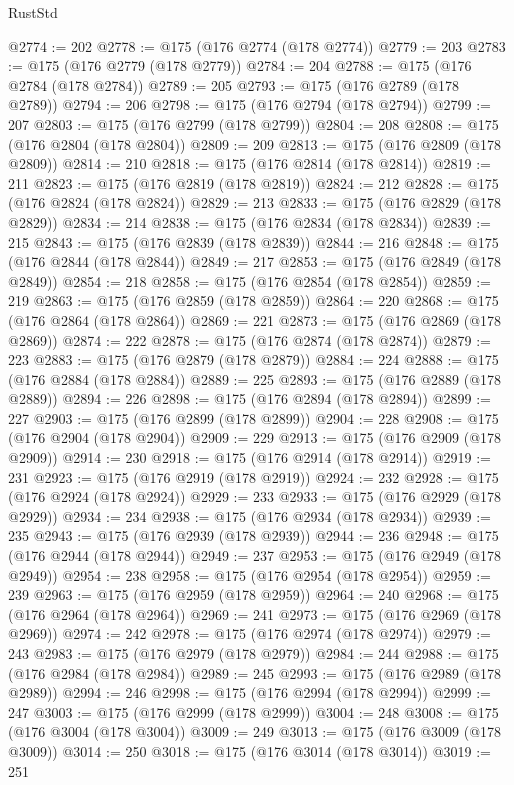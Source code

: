 \begin{lexlean}{RustStd}
\begin{coremodule}
@2774 := 202
@2778 := @175 (@176 @2774 (@178 @2774))
@2779 := 203
@2783 := @175 (@176 @2779 (@178 @2779))
@2784 := 204
@2788 := @175 (@176 @2784 (@178 @2784))
@2789 := 205
@2793 := @175 (@176 @2789 (@178 @2789))
@2794 := 206
@2798 := @175 (@176 @2794 (@178 @2794))
@2799 := 207
@2803 := @175 (@176 @2799 (@178 @2799))
@2804 := 208
@2808 := @175 (@176 @2804 (@178 @2804))
@2809 := 209
@2813 := @175 (@176 @2809 (@178 @2809))
@2814 := 210
@2818 := @175 (@176 @2814 (@178 @2814))
@2819 := 211
@2823 := @175 (@176 @2819 (@178 @2819))
@2824 := 212
@2828 := @175 (@176 @2824 (@178 @2824))
@2829 := 213
@2833 := @175 (@176 @2829 (@178 @2829))
@2834 := 214
@2838 := @175 (@176 @2834 (@178 @2834))
@2839 := 215
@2843 := @175 (@176 @2839 (@178 @2839))
@2844 := 216
@2848 := @175 (@176 @2844 (@178 @2844))
@2849 := 217
@2853 := @175 (@176 @2849 (@178 @2849))
@2854 := 218
@2858 := @175 (@176 @2854 (@178 @2854))
@2859 := 219
@2863 := @175 (@176 @2859 (@178 @2859))
@2864 := 220
@2868 := @175 (@176 @2864 (@178 @2864))
@2869 := 221
@2873 := @175 (@176 @2869 (@178 @2869))
@2874 := 222
@2878 := @175 (@176 @2874 (@178 @2874))
@2879 := 223
@2883 := @175 (@176 @2879 (@178 @2879))
@2884 := 224
@2888 := @175 (@176 @2884 (@178 @2884))
@2889 := 225
@2893 := @175 (@176 @2889 (@178 @2889))
@2894 := 226
@2898 := @175 (@176 @2894 (@178 @2894))
@2899 := 227
@2903 := @175 (@176 @2899 (@178 @2899))
@2904 := 228
@2908 := @175 (@176 @2904 (@178 @2904))
@2909 := 229
@2913 := @175 (@176 @2909 (@178 @2909))
@2914 := 230
@2918 := @175 (@176 @2914 (@178 @2914))
@2919 := 231
@2923 := @175 (@176 @2919 (@178 @2919))
@2924 := 232
@2928 := @175 (@176 @2924 (@178 @2924))
@2929 := 233
@2933 := @175 (@176 @2929 (@178 @2929))
@2934 := 234
@2938 := @175 (@176 @2934 (@178 @2934))
@2939 := 235
@2943 := @175 (@176 @2939 (@178 @2939))
@2944 := 236
@2948 := @175 (@176 @2944 (@178 @2944))
@2949 := 237
@2953 := @175 (@176 @2949 (@178 @2949))
@2954 := 238
@2958 := @175 (@176 @2954 (@178 @2954))
@2959 := 239
@2963 := @175 (@176 @2959 (@178 @2959))
@2964 := 240
@2968 := @175 (@176 @2964 (@178 @2964))
@2969 := 241
@2973 := @175 (@176 @2969 (@178 @2969))
@2974 := 242
@2978 := @175 (@176 @2974 (@178 @2974))
@2979 := 243
@2983 := @175 (@176 @2979 (@178 @2979))
@2984 := 244
@2988 := @175 (@176 @2984 (@178 @2984))
@2989 := 245
@2993 := @175 (@176 @2989 (@178 @2989))
@2994 := 246
@2998 := @175 (@176 @2994 (@178 @2994))
@2999 := 247
@3003 := @175 (@176 @2999 (@178 @2999))
@3004 := 248
@3008 := @175 (@176 @3004 (@178 @3004))
@3009 := 249
@3013 := @175 (@176 @3009 (@178 @3009))
@3014 := 250
@3018 := @175 (@176 @3014 (@178 @3014))
@3019 := 251

\end{coremodule}
\end{lexlean}

